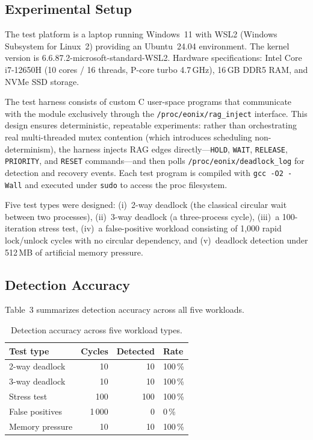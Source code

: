 \documentclass[11pt,letterpaper]{article}
\begin{document}
\subsection{Experimental Setup}

The test platform is a laptop running Windows~11 with WSL2 (Windows
Subsystem for Linux~2) providing an Ubuntu~24.04 environment.  The
kernel version is 6.6.87.2-microsoft-standard-WSL2.  Hardware
specifications: Intel Core i7-12650H (10 cores / 16 threads, P-core
turbo 4.7\,GHz), 16\,GB DDR5 RAM, and NVMe SSD storage.

The test harness consists of custom C user-space programs that
communicate with the module exclusively through the
\texttt{/proc/eonix/rag\_inject} interface.  This design ensures
deterministic, repeatable experiments: rather than orchestrating real
multi-threaded mutex contention (which introduces scheduling
non-determinism), the harness injects RAG edges directly---\texttt{HOLD},
\texttt{WAIT}, \texttt{RELEASE}, \texttt{PRIORITY}, and
\texttt{RESET} commands---and then polls
\texttt{/proc/eonix/deadlock\_log} for detection and recovery events.
Each test program is compiled with \texttt{gcc -O2 -Wall} and executed
under \texttt{sudo} to access the proc filesystem.

Five test types were designed: (i)~2-way deadlock (the classical
circular wait between two processes), (ii)~3-way deadlock (a
three-process cycle), (iii)~a 100-iteration stress test, (iv)~a
false-positive workload consisting of 1,000 rapid lock/unlock cycles
with no circular dependency, and (v)~deadlock detection under 512\,MB
of artificial memory pressure.

\subsection{Detection Accuracy}

Table~3 summarizes detection accuracy across all five workloads.

\begin{table}[h]
\centering
\begin{tabular}{lrrl}
\toprule
\textbf{Test type} & \textbf{Cycles} & \textbf{Detected} & \textbf{Rate} \\
\midrule
2-way deadlock & 10 & 10 & 100\,\% \\
3-way deadlock & 10 & 10 & 100\,\% \\
Stress test & 100 & 100 & 100\,\% \\
False positives & 1\,000 & 0 & 0\,\% \\
Memory pressure & 10 & 10 & 100\,\% \\
\bottomrule
\end{tabular}
\caption{Detection accuracy across five workload types.}
\end{table}
\end{document}
